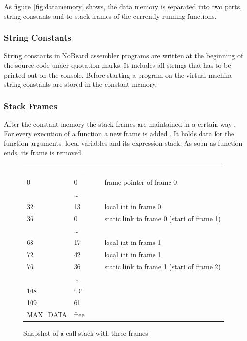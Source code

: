 As figure~\ref{fig:datamemory} shows, the data memory is separated into two parts, string constants and to stack frames of the currently running functions. 

\subsubsection{String Constants}
String constants in NoBeard assembler programs  are  written at the beginning of the source code under quotation marks. It includes all strings that has to be printed out on the console. Before starting a program on the virtual machine string constants are stored in the constant memory. 

\subsubsection{Stack Frames}
After the constant memory the stack frames are maintained in a certain way . For every execution of a function a new frame is added . It holds data for the function arguments, local variables and its expression stack. As soon as  function ends, its frame is removed. 

\begin{figure}
\begin{center}
\begin{tabular}{p{8em}|p{4em}|p{15em}}
\parbox[b][1em][b]{8em}{\hfill {}\textcolor{White}{Address}} & \textcolor{White}{Content} & \textcolor{White}{Remark} \\  
\parbox[t][1em][t]{5em}{\hfill 0} & 0 & frame pointer of frame 0 \\ 
& \ldots \\ 
\parbox[t][1em][t]{5em}{\hfill 32} & 13 & local int in frame 0 \\ 
\parbox[t][1em][t]{5em}{\hfill 36} & 0 & static link to frame 0 (start of frame 1)\\ 
& \ldots \\ 
\parbox[t][1em][t]{5em}{\hfill 68} & 17 & local int in frame 1\\ 
\parbox[t][1em][t]{5em}{\hfill 72} & 42 & local int in frame 1\\ 
\parbox[t][1em][t]{5em}{\hfill 76} & 36 & static link to frame 1 (start of frame 2) \\ 
& \ldots \\ 
\parbox[t][1em][t]{5em}{\hfill 108} & `D' \\ 
\parbox[t][1em][t]{5em}{\hfill 109} & 61 \\ 
\parbox[b][4em][b]{8em}{\hfill MAX\_DATA} & free \\ 
\end{tabular}
\end{center}
\caption{Snapshot of a call stack with three frames}\label{fig:threeframes}
\end{figure}

